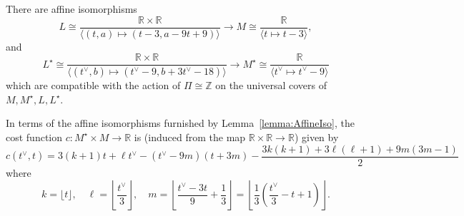 \documentclass[10pt,a4paper]{amsart}
\newcommand{\RR}{\mathbb{R}}
\newcommand{\ZZ}{\mathbb{Z}}
\begin{document}
\begin{lemma}\label{lemma:AffineIso}
    There are affine isomorphisms 
    \[
L \cong \frac{\RR\times\RR}{\langle (t,a)\mapsto (t-3,a-9t+9)\rangle} \longrightarrow M \cong \frac{\RR}{\langle t\mapsto t-3\rangle},
\]
and 
\[
L^\star \cong \frac{\RR\times\RR}{\langle (t^\vee,b)\mapsto (t^\vee-9,b+3t^\vee-18)\rangle} \longrightarrow M^\star \cong \frac{\RR}{\langle t^\vee\mapsto t^\vee-9\rangle}
\]
which are compatible with the action of $\Pi\cong\ZZ$ on the universal covers  of $M,M^\star,L,L^\star$.
\end{lemma}

\begin{prop}
    In terms of the affine isomorphisms furnished by Lemma~\ref{lemma:AffineIso}, the cost function $c:M^\star\times M \to \RR$ is (induced from the map $\RR\times\RR \to \RR$) given by
    \[
c(t^\vee,t) = 3(k+1)t + \ell t^\vee-(t^\vee -9m)(t+3m) - \frac{3k(k+1)+3\ell(\ell+1)+9m(3m-1)}{2}
\]
where
\[
k= \lfloor t \rfloor, \quad \ell = \left\lfloor \frac{t^\vee}{3}\right\rfloor, \quad m =\left \lfloor \frac{t^\vee-3t}{9}+\frac{1}{3}\right\rfloor = \left\lfloor \frac{1}{3}\left(\frac{t^\vee}{3}-t + 1 \right)\right\rfloor.
\]
\end{prop}
\end{document}
